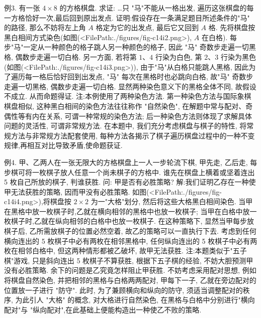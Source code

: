 例3. 有一张 $4 \times 8$ 的方格棋盘.
求证: …只 "马"不能从一格出发, 遍历这张棋盘的每一方格恰好一次,最后回到原出发点.
证明:假设存在一条满足题目所述条件的"马" 的路径, 那么不妨将左上角 $A$ 格定为它的出发点, 最后它又回到 $A$ 格.
先将棋盘按黑白相间方式染色(如图(<FilePath:./figures/fig-c14i2.png>), $A$ 在白格). 每步"马"一定从一种颜色的格子跳人另一种颜色的格子, 因此 "马" 奇数步走遍一切黑格, 偶数步走遍一切白格.
另一方面, 若将第 $1 、 4$ 行染为白色, 第 $2 、 3$ 行染为黑色 (如图(<FilePath:./figures/fig-c14i3.png>)), 由于"马"从白格只能跳人黑格, 因此为了遍历每一格后恰好回到出发点, "马" 每次在黑格时也必跳向白格, 故"马" 奇数步走遍一切黑格, 偶数步走遍一切白格.
显然两种染色意义下的黑格全体不同, 故假设不成立.
从而命题得证.
注:本例使用了两种染色方法.
第一种染色方法与国际象棋棋盘相似, 这种黑白相间的染色方法往往称作 "自然染色", 在解题中常与配对、奇偶性等有内在关系, 可谓一种常规的染色方法; 后一种染色方法则体现了求解具体问题的灵活性, 可谓非常规方法.
在本题中, 我们充分考虑棋盘与棋子的特性, 将常规方法与非常规方法配套使用, 每种方法各揭示了棋子遍历棋盘过程中的一种不变规律,再相互对比导致矛盾,使命题获证.



例4. 甲、乙两人在一张无限大的方格棋盘上一人一步轮流下棋, 甲先走, 乙后走, 每步棋可将一枚棋子放人任意一个尚未棋子的方格中.
谁先在棋盘上横着或坚着连出 5 枚自己所放的棋子, 判谁获胜.
问: 甲是否有必胜策略?
解:我们证明乙存在一种使甲无法获胜的策略, 因而甲没有必胜策略.
如图(<FilePath:./figures/fig-c14i4.png>),将棋盘按 $2 \times 2$ 为一"大格"划分, 然后将这些大格黑白相间染色.
当甲在黑格中放一枚棋子时,乙就在横向相邻的黑格中也放一枚棋子; 当甲在白格中放一枚棋子时,乙就在纵向相邻的白格中也放一枚棋子.
在这种策略下, 显然当甲每步放棋子后, 乙所需放棋子的位置必然空着, 故乙的策略可以一直执行下去.
考虑到任何横向连出的 5 枚棋子中必有两枚在相邻黑格中, 任何纵向连出的 5 枚棋子中必有两枚在相邻白格中, 但这两种情形都被乙破坏, 故甲无法获胜.
注:本题类似于"五子棋"游戏, 只是斜向连出 5 枚棋子不算获胜, 根据下五子棋的经验, 不妨大胆预测甲没有必胜策略.
余下的问题是乙究竟怎样阻止甲获胜.
不妨考虑采用配对思想, 例如将棋盘自然染色, 并把相邻的黑格与白格两两配对, 甲每下一子, 乙就在旁边配对的位置放一子进行 "防守". 此时, 为了兼顾横向和纵向的防守, 须适当调整配对的秩序, 为此引人 "大格" 的概念, 对大格进行自然染色, 在黑格与白格中分别进行"横向配对"与 "纵向配对",在此基础上便能构造出一种使乙不败的策略.



